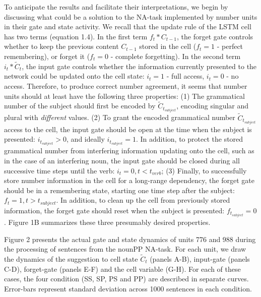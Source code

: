 To anticipate the results and facilitate their interpretations, we begin by discussing what could be a solution to the NA-task implemented by number units in their gate and state activity. We recall that the update rule of the LSTM cell has two terms (equation 1.4). In the first term $f_t * C_{t-1}$, the forget gate controls whether to keep the previous content $C_{t-1}$ stored in the cell ($f_t=1$ - perfect remembering), or forget it ($f_t=0$ - complete forgetting). In the second term $i_t*\tilde{C}_t$, the input gate controls whether the information currently presented to the network could be updated onto the cell state: $i_t=1$ - full access, $i_t=0$ - no access. Therefore, to produce correct number agreement, it seems that number units should at least have the following three properties: (1) The grammatical number of the subject should first be encoded by $\tilde{C}_{t_{subject}}$, encoding singular and plural with \textit{different} values. (2) To grant the encoded grammatical number $\tilde{C}_{t_{subject}}$ access to the cell, the input gate should be open at the time when the subject is presented: $i_{t_{subject}}>0$, and ideally $i_{t_{subject}}=1$. In addition, to protect the stored grammatical number from interfering information updating onto the cell, such as in the case of an interfering noun, the input gate should be closed during all successive time steps until the verb: $i_t=0, t<t_{verb}$; (3) Finally, to successfully store number information in the cell for a long-range dependency, the forget gate should be in a remembering state, starting one time step after the subject: $f_t=1, t>t_{subject}$. In addition, to clean up the cell from previously stored information, the forget gate should reset when the subject is presented: $f_{t_{subject}}=0$. Figure 1B summarizes these three presumably desired properties.

Figure 2 presents the actual gate and state dynamics of units 776 and 988 during the processing of sentences from the nounPP NA-task. For each unit, we draw the dynamics of the suggestion to cell state $\tilde{C}_t$ (panels A-B), input-gate (panels C-D), forget-gate (panels E-F) and the cell variable (G-H). For each of these cases, the four condition (SS, SP, PS and PP) are described in separate curves. Error-bars represent standard deviation across 1000 sentences in each condition.

